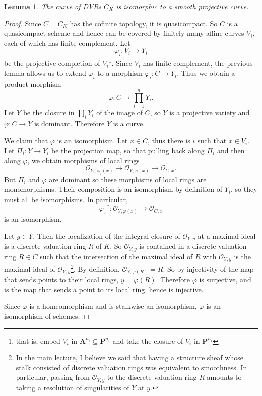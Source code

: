\documentclass[reqno,12pt,letterpaper]{amsart}
\newcommand{\PP}{\mathbf P}
\newcommand{\Aff}{\mathbf A}
\newcommand{\Olo}{\mathscr O}
\newtheorem{lemma}[theorem]{Lemma}
\theoremstyle{definition}
\begin{document}
\begin{lemma}
The curve of DVRs $C_K$ is isomorphic to a smooth projective curve.
\end{lemma}
\begin{proof}
Since $C = C_K$ has the cofinite topology, it is quasicompact.
So $C$ is a quasicompact scheme and hence can be covered by finitely many affine curves $V_i$, each of which has finite complement.
Let
$$\varphi_i: V_i \to Y_i$$
be the projective completion of $V_i$\footnote{that is, embed $V_i$ in $\Aff^{n_i} \subseteq \PP^{n_i}$ and take the closure of $V_i$ in $\PP^{n_i}$}.
Since $V_i$ has finite complement, the previous lemma allows us to extend $\varphi_i$ to a morphism $\overline \varphi_i: C \to Y_i$.
Thus we obtain a product morphism
$$\varphi: C \to \prod_{i=1}^n Y_i.$$
Let $Y$ be the closure in $\prod_i Y_i$ of the image of $C$, so $Y$ is a projective variety and $\varphi: C \to Y$ is dominant.
Therefore $Y$ is a curve.

We claim that $\varphi$ is an isomorphism.
Let $x \in C$, thus there is $i$ such that $x \in V_i$. Let $\Pi_i: Y \to Y_i$ be the projection map, so that pulling back along $\Pi_i$ and then along $\varphi$, we obtain morphisms of local rings
$$\Olo_{Y_i, \varphi_i(x)} \to \Olo_{Y, \varphi(x)} \to \Olo_{C, x}.$$
But $\Pi_i$ and $\varphi$ are dominant so these morphisms of local rings are monomorphisms.
Their composition is an isomorphism by definition of $Y_i$, so they must all be isomorphisms.
In particular,
$${\varphi_x}^* : \Olo_{Y, \varphi(x)} \to \Olo_{C, x}$$
is an isomorphism.

Let $y \in Y$. Then the localization of the integral closure of $\Olo_{Y, y}$ at a maximal ideal is a discrete valuation ring $R$ of $K$.
So $\Olo_{Y, y}$ is contained in a discrete valuation ring $R \in C$ such that the intersection of the maximal ideal of $R$ with $\Olo_{Y, y}$ is the maximal ideal of $\Olo_{Y, y}$\footnote{In the main lecture,
I believe we said that having a structure sheaf whose stalk consisted of discrete valuation rings was equivalent to smoothness.
In particular, passing from $\Olo_{Y, y}$ to the discrete valuation ring $R$ amounts to taking a resolution of singularities of $Y$ at $y$.}.
By definition, $\Olo_{Y, \varphi(R)} = R$. So by injectivity of the map that sends points to their local rings, $y = \varphi(R)$.
Therefore $\varphi$ is surjective, and is the map that sends a point to its local ring, hence is injective.

Since $\varphi$ is a homeomorphism and is stalkwise an isomorphism, $\varphi$ is an isomorphism of schemes.
\end{proof}
\end{document}
